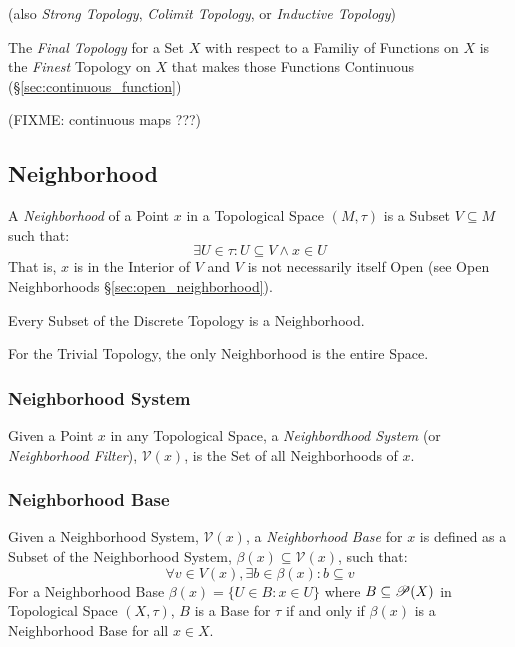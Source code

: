 (also \emph{Strong Topology}, \emph{Colimit Topology}, or
\emph{Inductive Topology})

The \emph{Final Topology} for a Set $X$ with respect to a Familiy of
Functions on $X$ is the \emph{Finest} Topology on $X$ that makes those
Functions Continuous (\S\ref{sec:continuous_function})

(FIXME: continuous maps ???)



\subsection{Neighborhood}\label{sec:neighborhood}

A \emph{Neighborhood} of a Point $x$ in a Topological Space $(M,\tau)$
is a Subset $V \subseteq M$ such that:
\[
  \exists U \in \tau : U \subseteq V \wedge x \in U
\]
That is, $x$ is in the Interior of $V$ and $V$ is not necessarily
itself Open (see Open Neighborhoods \S\ref{sec:open_neighborhood}).

Every Subset of the Discrete Topology is a Neighborhood.

For the Trivial Topology, the only Neighborhood is the entire Space.



\subsubsection{Neighborhood System}\label{sec:neighborhood_system}

Given a Point $x$ in any Topological Space, a \emph{Neighbordhood
  System} (or \emph{Neighborhood Filter}), $\mathcal{V}(x)$, is the
Set of all Neighborhoods of $x$.



\subsubsection{Neighborhood Base}\label{sec:neighborhood_base}

Given a Neighborhood System, $\mathcal{V}(x)$, a \emph{Neighborhood
  Base} for $x$ is defined as a Subset of the Neighborhood System,
$\beta(x) \subseteq \mathcal{V}(x)$, such that:
\[
  \forall v \in V(x), \exists b \in \beta(x) : b \subseteq v
\]
For a Neighborhood Base $\beta(x) = \{ U \in B : x \in U \}$ where $B
\subseteq \mathscr{P}(X)$ in Topological Space $(X,\tau)$, $B$ is a
Base for $\tau$ if and only if $\beta(x)$ is a Neighborhood Base for
all $x \in X$.



